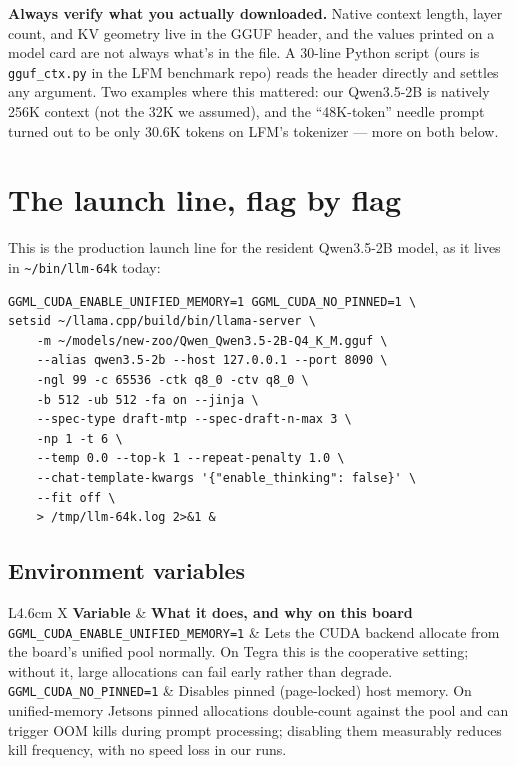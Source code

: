 \documentclass[11pt,a4paper]{article}
\newcommand{\flag}[1]{\texttt{\textcolor{flagcolour}{#1}}}
\begin{document}
\textbf{Always verify what you actually downloaded.} Native context length,
layer count, and KV geometry live in the GGUF header, and the values printed
on a model card are not always what's in the file. A 30-line Python script
(ours is \texttt{gguf\_ctx.py} in the LFM benchmark repo) reads the header
directly and settles any argument. Two examples where this mattered: our
Qwen3.5-2B is natively 256K context (not the 32K we assumed), and the
``48K-token'' needle prompt turned out to be only 30.6K tokens on LFM's
tokenizer --- more on both below.

\section{The launch line, flag by flag}

This is the production launch line for the resident Qwen3.5-2B model, as it
lives in \texttt{\textasciitilde/bin/llm-64k} today:

\begin{lstlisting}
GGML_CUDA_ENABLE_UNIFIED_MEMORY=1 GGML_CUDA_NO_PINNED=1 \
setsid ~/llama.cpp/build/bin/llama-server \
    -m ~/models/new-zoo/Qwen_Qwen3.5-2B-Q4_K_M.gguf \
    --alias qwen3.5-2b --host 127.0.0.1 --port 8090 \
    -ngl 99 -c 65536 -ctk q8_0 -ctv q8_0 \
    -b 512 -ub 512 -fa on --jinja \
    --spec-type draft-mtp --spec-draft-n-max 3 \
    -np 1 -t 6 \
    --temp 0.0 --top-k 1 --repeat-penalty 1.0 \
    --chat-template-kwargs '{"enable_thinking": false}' \
    --fit off \
    > /tmp/llm-64k.log 2>&1 &
\end{lstlisting}

\subsection{Environment variables}

\begin{center}
\small
\begin{tabularx}{\textwidth}{L{4.6cm} X}
\toprule
\textbf{Variable} & \textbf{What it does, and why on this board} \\
\midrule
\flag{GGML\_CUDA\_ENABLE\_\allowbreak UNIFIED\_MEMORY=1} & Lets the CUDA backend allocate from the board's unified pool normally. On Tegra this is the cooperative setting; without it, large allocations can fail early rather than degrade. \\
\flag{GGML\_CUDA\_\allowbreak NO\_PINNED=1} & Disables pinned (page-locked) host memory. On unified-memory Jetsons pinned allocations double-count against the pool and can trigger OOM kills during prompt processing; disabling them measurably reduces kill frequency, with no speed loss in our runs. \\
\bottomrule
\end{tabularx}
\end{center}
\end{document}
